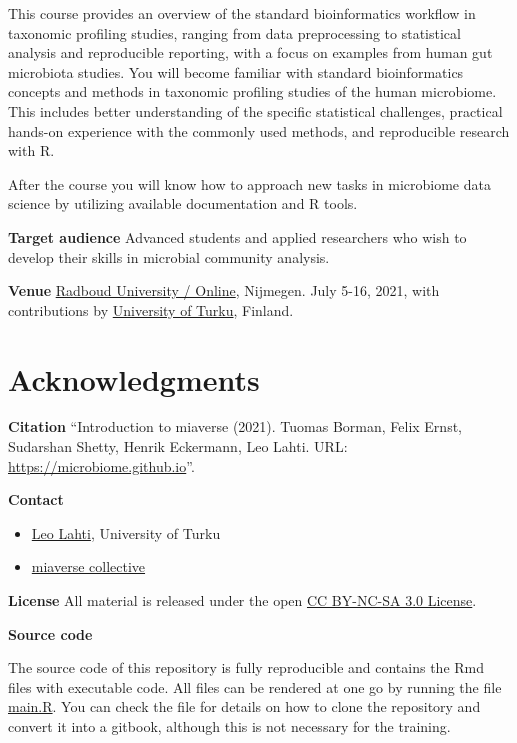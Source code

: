 \documentclass[
  oneside]{book}
\providecommand{\tightlist}{%
  \setlength{\itemsep}{0pt}\setlength{\parskip}{0pt}}
\begin{document}
This course provides an overview of the standard bioinformatics
workflow in taxonomic profiling studies, ranging from data
preprocessing to statistical analysis and reproducible reporting, with
a focus on examples from human gut microbiota studies. You
will become familiar with standard bioinformatics concepts and methods
in taxonomic profiling studies of the human microbiome. This includes
better understanding of the specific statistical challenges, practical
hands-on experience with the commonly used methods, and reproducible
research with R.

After the course you will know how to approach new tasks in microbiome
data science by utilizing available documentation and R tools.

\textbf{Target audience} Advanced students and applied researchers who wish
to develop their skills in microbial community analysis.

\textbf{Venue} \href{}{Radboud University / Online}, Nijmegen. July 5-16, 2021,
with contributions by \href{http://datascience.utu.fi}{University of
Turku}, Finland.

\hypertarget{acknowledgments}{%
\section{Acknowledgments}\label{acknowledgments}}

\textbf{Citation} ``Introduction to miaverse (2021). Tuomas Borman, Felix Ernst, Sudarshan Shetty, Henrik Eckermann, Leo Lahti. URL: \url{https://microbiome.github.io}''.

\textbf{Contact}

\begin{itemize}
\tightlist
\item
  \href{http://datascience.utu.fi}{Leo Lahti}, University of Turku
\item
  \href{https://microbiome.github.io}{miaverse collective}
\end{itemize}

\textbf{License} All material is released under the open \href{LICENSE}{CC BY-NC-SA 3.0 License}.

\textbf{Source code}

The source code of this repository is fully reproducible and contains
the Rmd files with executable code. All files can be rendered at one
go by running the file \url{main.R}. You can check the file for
details on how to clone the repository and convert it into a gitbook,
although this is not necessary for the training.
\end{document}
